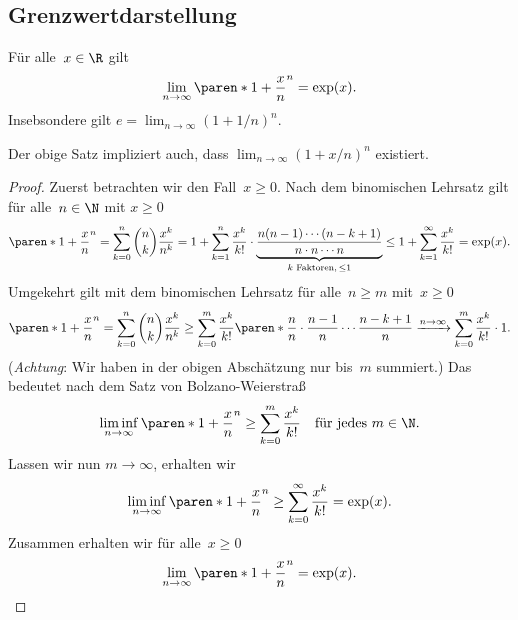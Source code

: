 \documentclass[a4paper]{article}
\begin{document}
\subsection{Grenzwertdarstellung}

\begin{theorem}
    Für alle~$x \in \R$ gilt
    \begin{equation*}
        \lim_{n\to\infty} \paren*{1+\frac{x}{n}}^n = \exp(x).
    \end{equation*}
    Insebsondere gilt $e = \lim_{n\to\infty} (1+1/n)^n$.
\end{theorem}

Der obige Satz impliziert auch, dass $\lim_{n\to\infty} (1+x/n)^n$ existiert.

\begin{proof}
    Zuerst betrachten wir den Fall~$x \geq 0$. Nach dem binomischen Lehrsatz gilt für alle~$n \in \N$ mit $x \geq 0$
    \begin{equation*}
        \paren*{1+\frac{x}{n}}^n = \sum_{k=0}^n \binom{n}{k} \frac{x^k}{n^k} = 1 + \sum_{k=1}^n \frac{x^k}{k!} \cdot \underbrace{\frac{n(n-1)\cdots(n-k+1)}{n\cdot n\cdots n}}_{k\text{ Faktoren},\, \leq 1} \leq 1 + \sum_{k=1}^\infty \frac{x^k}{k!} = \exp(x).
    \end{equation*}
    Umgekehrt gilt mit dem binomischen Lehrsatz für alle~$n \geq m$ mit~$x \geq 0$
    \begin{equation*}
        \paren*{1+\frac{x}{n}}^n = \sum_{k=0}^n \binom{n}{k} \frac{x^k}{n^k} \geq \sum_{k=0}^m \frac{x^k}{k!} \paren*{\frac{n}{n}\cdot\frac{n-1}{n}\cdots\frac{n-k+1}{n}} \xrightarrow{n\to\infty} \sum_{k=0}^m \frac{x^k}{k!} \cdot 1.
    \end{equation*}
    (\emph{Achtung}: Wir haben in der obigen Abschätzung nur bis~$m$ summiert.) Das bedeutet nach dem Satz von Bolzano-Weierstraß
    \begin{equation*}
        \liminf_{n\to\infty} \paren*{1+\frac{x}{n}}^n \geq \sum_{k=0}^m \frac{x^k}{k!} \quad\text{für jedes } m \in \N.
    \end{equation*}
    Lassen wir nun $m \to \infty$, erhalten wir
    \begin{equation*}
        \liminf_{n\to\infty} \paren*{1+\frac{x}{n}}^n \geq \sum_{k=0}^\infty \frac{x^k}{k!} = \exp(x).
    \end{equation*}
    Zusammen erhalten wir für alle~$x \geq 0$
    \begin{equation*}
        \lim_{n\to\infty} \paren*{1+\frac{x}{n}}^n = \exp(x).
    \end{equation*}


\end{proof}
\end{document}
